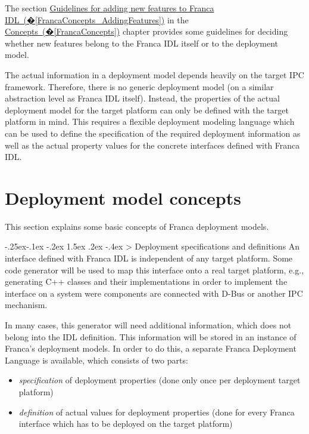 \documentclass[a4paper,10pt]{scrreprt}
\makeatletter
\renewcommand\subsection{\medskip\@startsection{subsection}{2}{\z@}%
  {-.25ex\@plus -.1ex \@minus -.2ex}%
  {1.5ex \@plus .2ex \@minus -.4ex}%
  {\ifnum \scr@compatibility>\@nameuse{scr@v@2.96}\relax
    \setlength{\parfillskip}{\z@ plus 1fil}\fi
    \raggedsection\normalfont\sectfont\nobreak\size@subsection
  }%
}
\newlength{\XdocItemIndent}
\makeatother
\begin{document}
The section \hyperref[FrancaConcepts_AddingFeatures]{Guidelines for adding new features to Franca IDL~(�\ref*{FrancaConcepts_AddingFeatures})}
in the \hyperref[FrancaConcepts]{Concepts~(�\ref*{FrancaConcepts})} chapter provides some guidelines
for deciding whether new features belong to the Franca IDL itself or to
the deployment model.

The actual information in a deployment model depends heavily on the target IPC framework.
Therefore, there is no generic deployment model (on a similar abstraction level as
Franca IDL itself). Instead, the properties of the actual deployment model for the
target platform can only be defined with the target platform in mind. This requires
a flexible deployment modeling language which can be used to define the specification
of the required deployment information as well as the actual property values for the
concrete interfaces defined with Franca IDL.

\section{Deployment model concepts}
\label{DeploymentModels_Concepts}
This section explains some basic concepts of Franca deployment models.

\subsection{Deployment specifications and definitions}
\label{DeploymentModels_Concepts_Toplevel}
An interface defined with Franca IDL is independent of any target platform. 
Some code generator will be used to map this interface onto a real target platform,
e.g., generating C++ classes and their implementations in order to implement
the interface on a system were components are connected with D-Bus or another 
IPC mechanism.

In many cases, this generator will need additional information, which does
not belong into the IDL definition. This information will be stored in an instance
of Franca's deployment models. In order to do this, a separate Franca Deployment Language
is available, which consists of two parts:
\setlength{\XdocItemIndent}{\textwidth}
\begin{itemize}
\addtolength{\XdocItemIndent}{-2.5em}
\item \begin{minipage}[t]{\XdocItemIndent}
\textit{specification} of deployment properties (done only once per deployment target platform)

\end{minipage}
\item \begin{minipage}[t]{\XdocItemIndent}
\textit{definition} of actual values for deployment properties (done for every Franca interface
		which has to be deployed on the target platform)

\end{minipage}
\end{itemize}
\addtolength{\XdocItemIndent}{2.5em}
\end{document}
